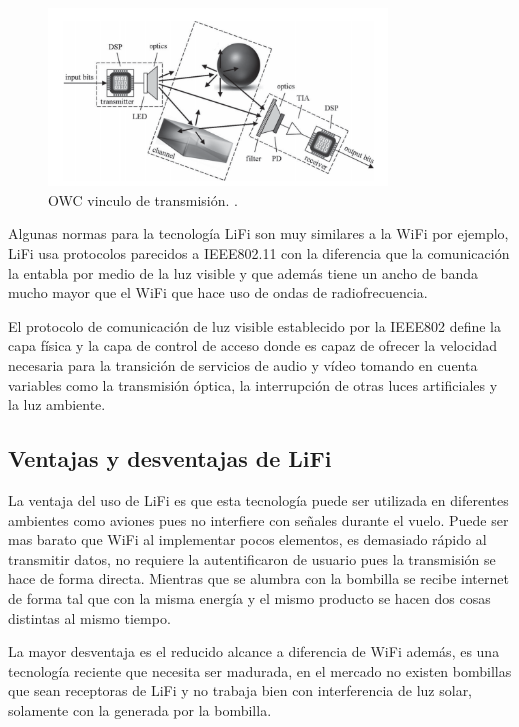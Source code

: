 \documentclass[10pt,journal,compsoc]{IEEEtran}
\begin{document}
\begin{figure}[h]
    \centering
    \includegraphics[width=9cm]{lifi2}
    \caption{OWC vinculo de transmisión. \cite{dimitroy}.}
    \label{fig:base-station}
\end{figure}

Algunas normas para la tecnología LiFi son muy similares a la WiFi por ejemplo, LiFi usa protocolos parecidos a IEEE802.11 con la diferencia que la comunicación la entabla por medio de la luz visible y que además tiene un ancho de banda mucho mayor que el WiFi que hace uso de ondas de radiofrecuencia.

El protocolo de comunicación de luz visible establecido por la IEEE802 define la capa física y la capa de control de acceso donde es capaz de ofrecer la velocidad necesaria para la transición de servicios de audio y vídeo tomando en cuenta variables como la transmisión óptica, la interrupción de otras luces artificiales y la  luz ambiente. 


\subsection{Ventajas y desventajas de LiFi}

La ventaja del uso de LiFi es que esta tecnología puede ser utilizada en diferentes ambientes como aviones pues no interfiere con señales durante el vuelo. Puede ser mas barato que WiFi al implementar pocos elementos, es demasiado rápido al transmitir datos, no requiere la autentificaron de usuario pues la transmisión se hace de forma directa. Mientras que se alumbra con la bombilla se recibe internet de forma tal que con la misma energía y el mismo producto se hacen dos cosas distintas al mismo tiempo.

La mayor desventaja es el reducido alcance a diferencia de WiFi además, es una tecnología reciente que necesita ser madurada, en el mercado no existen bombillas que sean receptoras de LiFi y no trabaja bien con interferencia de luz solar, solamente con la generada por la bombilla.
\end{document}
